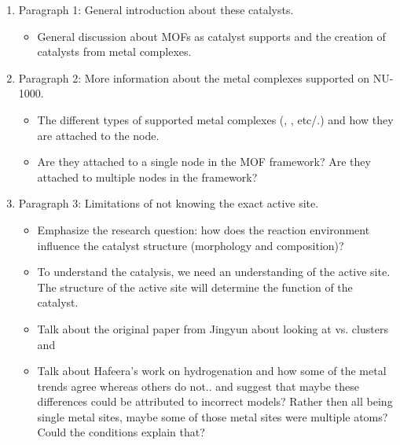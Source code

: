 \documentclass[journal=jctcce,manuscript=article]{achemso}
\begin{document}


\begin{enumerate}
    \item Paragraph 1: General introduction about these catalysts.
    \begin{itemize}
        \item General discussion about MOFs as catalyst supports and the creation of catalysts from metal complexes. 
    \end{itemize}
    \item Paragraph 2: More information about the metal complexes supported on NU-1000. 
    \begin{itemize}
        \item The different types of supported metal complexes (, , etc/.) and how they are attached to the node. 
        \item Are they attached to a single node in the MOF framework? Are they attached to multiple nodes in the framework? 
    \end{itemize}
    \item Paragraph 3: Limitations of not knowing the exact active site. 
    \begin{itemize}
        \item Emphasize the research question: how does the reaction environment influence the catalyst structure (morphology and composition)?
        \item To understand the catalysis, we need an understanding of the active site. The structure of the active site will determine the function of the catalyst.
        \item Talk about the original paper from Jingyun about looking at  vs. 
         clusters and 
        \item Talk about Hafeera's work on hydrogenation and how some of the metal trends agree whereas others do not.. and suggest that maybe these differences could be attributed to incorrect models? Rather then all being single metal sites, maybe some of those metal sites were multiple atoms? Could the conditions explain that? 

\end{itemize}
\end{enumerate}
\end{document}
